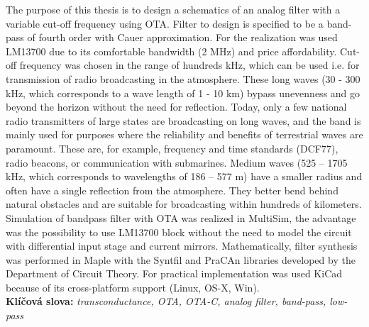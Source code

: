 \noindent The purpose of this thesis is to design a schematics of an analog filter with a variable cut-off frequency using OTA. Filter to design is specified to be a band-pass of fourth order with Cauer approximation. For the realization was used LM13700 due to its comfortable bandwidth (2 MHz) and price affordability. Cut-off frequency was chosen in the range of hundreds kHz, which can be used i.e. for transmission of radio broadcasting in the atmosphere. These long waves (30 - 300 kHz, which corresponds to a wave length of 1 - 10 km) bypass unevenness and go beyond the horizon without the need for reflection. Today, only a few national radio transmitters of large states are broadcasting on long waves, and the band is mainly used for purposes where the reliability and benefits of terrestrial waves are paramount. These are, for example, frequency and time standards (DCF77), radio beacons, or communication with submarines. Medium waves (525 -- 1705 kHz, which corresponds to wavelengths of 186 -- 577 m) have a smaller radius and often have a single reflection from the atmosphere. They better bend behind natural obstacles and are suitable for broadcasting within hundreds of kilometers. Simulation of bandpass filter with OTA was realized in MultiSim, the advantage was the possibility to use LM13700 block without the need to model the circuit with differential input stage and current mirrors. Mathematically, filter synthesis was performed in Maple with the Syntfil and PraCAn libraries developed by the Department of Circuit Theory. For practical implementation was used KiCad because of its cross-platform support (Linux, OS-X, Win). \\

\noindent \textbf{Klíčová slova:} \textit{transconductance, OTA, OTA-C, analog filter, band-pass, low-pass} \\